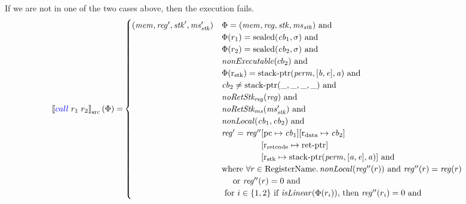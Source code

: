 \documentclass[a4paper]{article}
\newcommand{\sem}[1]{\left\llbracket #1 \right\rrbracket}
\newcommand{\ssem}[2][\Phi]{\sem{#2}_{\mathrm{src}}(#1)}
\newcommand{\tand}{\text{ and }}
\newcommand{\sourcecolor}[1]{\color{blue}}
\newcommand{\src}[1]{{\sourcecolor{} #1}}
\newcommand{\zinstr}[1]{#1}
\newcommand{\twoinstr}[3]{
  \ifthenelse{\equal{#2#3}{}}
  {\zinstr{#1}}
  {\zinstr{#1} \; #2 \; #3}
}
\newcommand{\scall}[2]{\twoinstr{\src{call}}{#1}{#2}}
\newcommand{\update}[2]{[#1 \mapsto #2]}
\newcommand{\shareddom}[1]{\mathrm{#1}}
\newcommand{\RegName}{\shareddom{RegisterName}}
\newcommand{\perm}{\var{perm}}
\newcommand{\stkptr}[1]{\mathrm{stack\text{-}ptr}(#1)}
\newcommand{\retptr}{\mathrm{ret\text{-}ptr}}
\newcommand{\sealed}[1]{\shareddom{sealed}(#1)}
\newcommand{\var}[1]{\mathit{#1}}
\newcommand{\reg}{\var{reg}}
\newcommand{\mem}{\var{mem}}
\newcommand{\ms}{\var{ms}}
\newcommand{\stk}{\var{stk}}
\newcommand{\cb}{\var{cb}}
\newcommand{\baddr}{\var{b}}
\newcommand{\eaddr}{\var{e}}
\newcommand{\aaddr}{\var{a}}
\newcommand{\stdrng}{[\baddr,\eaddr]}
\newcommand{\pcreg}{\mathrm{pc}}
\newcommand{\rstk}{\mathrm{r}_\mathrm{stk}}
\newcommand{\rretc}{\mathrm{r}_\mathrm{ret code}}
\newcommand{\rdata}{\mathrm{r}_\mathrm{data}}
\newcommand{\plainfun}[2]{
  \ifthenelse{\equal{#2}{}}
  {\mathit{#1}}
  {\mathit{#1}(#2)}
}
\newcommand{\nonExec}[1]{\plainfun{nonExecutable}{#1}}
\newcommand{\nonLoc}[1]{\plainfun{nonLocal}{#1}}
\newcommand{\isLinear}[1]{\plainfun{isLinear}{#1}}
\newcommand{\noRetStkReg}[1]{\plainfun{noRetStk_{reg}}{#1}}
\newcommand{\noRetStkMs}[1]{\plainfun{noRetStk_{ms}}{#1}}
\begin{document}
If we are not in one of the two cases above, then the execution fails.
\begin{align*}
  \ssem{\scall{r_1}{r_2}} = & 
    \begin{cases}
      (\mem,\reg',\stk',\ms_\stk') & \arraycolsep=0pt
                                      \begin{array}[t]{l}
                                        \Phi = (\mem,\reg,\stk,\ms_\stk) \text{ and } \\
                                        \Phi(r_1) = \sealed{\cb_1,\sigma} \text{ and } \\
                                        \Phi(r_2) = \sealed{\cb_2,\sigma} \text{ and } \\
                                        \nonExec{cb_2} \text{ and } \\
                                        \Phi(\rstk) = \stkptr{\perm, \stdrng, \aaddr} \text{ and } \\
                                        \cb_2 \neq \stkptr{\_,\_,\_,\_} \text{ and } \\
                                        \noRetStkReg{\reg} \text{ and } \\
                                        \noRetStkMs{\ms_\stk'} \text{ and } \\
                                        \nonLoc{\cb_1,\cb_2} \text{ and } \\
                                        \reg' = \reg''
                                        \begin{array}[t]{l}
                                        \update{\pcreg}{\cb_1}\update{\rdata}{\cb_2}\\
                                        \update{\rretc}{\retptr}\\
                                        \update{\rstk}{\stkptr{\perm,[\aaddr,\eaddr],\aaddr}} \text{ and }
                                        \end{array}
\\
                                        \text{where $\forall r \in \RegName \ldotp \nonLoc{\reg''(r)} \text{ and } \reg''(r) = \reg(r)$}\\
                                        \quad \text{$\text{ or } \reg''(r)=0 $} \tand \\
                                        \text{ for $i \in \{1,2\}$ if $\isLinear{\Phi(r_i)}$, then $\reg''(r_i) = 0$ and} \\

\end{array}
\end{cases}
\end{align*}
\end{document}

